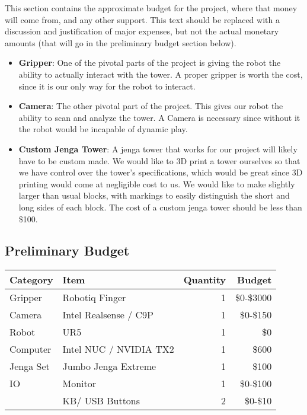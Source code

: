 This section contains the approximate budget for the project, where that money will come from, and any other support. This text should be replaced with a discussion and justification of major expenses, but not the actual monetary amounts (that will go in the preliminary budget section below). 
\begin{itemize}
    \item \textbf{Gripper}: One of the pivotal parts of the project is giving the robot the ability to actually interact with the tower. A proper gripper is worth the cost, since it is our only way for the robot to interact.
    
    \item \textbf{Camera}: The other pivotal part of the project. This gives our robot the ability to scan and analyze the tower. A Camera is necessary since without it the robot would be incapable of dynamic play.

    \item \textbf{Custom Jenga Tower}: A jenga tower that works for our project will likely have to be custom made. We would like to 3D print a tower ourselves so that we have control over the tower's specifications, which would be great since 3D printing would come at negligible cost to us. We would like to make slightly larger than usual blocks, with markings to easily distinguish the short and long sides of each block. The cost of a custom jenga tower should be less than \$100.
\end{itemize}
\subsection{Preliminary Budget}
\begin{table}[h!]
	\centering
	\begin{tabular}{|l|l|r|r|}
		\hline
		Category    &  Item                   & Quantity & Budget     \\
		\hline
        Gripper     & Robotiq Finger          &   1      & \$0-\$3000 \\
		Camera      & Intel Realsense / C9P   &   1      & \$0-\$150  \\
		Robot       & UR5                     &   1      & \$0        \\
  		Computer    & Intel NUC / NVIDIA TX2  &   1      & \$600      \\
  		Jenga Set   & Jumbo Jenga Extreme     &   1      & \$100      \\
  		IO          & Monitor                 &   1      & \$0-\$100  \\
  		            & KB/ USB Buttons         &   2      & \$0-\$10   \\
		\hline
	\end{tabular}
\end{table}


